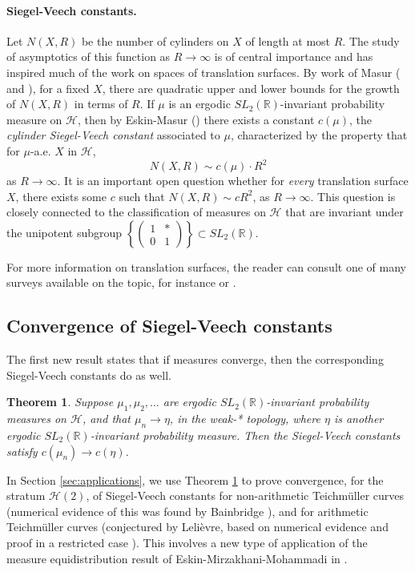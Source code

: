 \documentclass{article}
\newtheorem{thm}{Theorem}[section]
\theoremstyle{definition}
\begin{document}
\paragraph{Siegel-Veech constants.}  Let $N(X,R)$ be the number of cylinders on $X$ of length at most $R$.  The study of asymptotics of this function as $R\to\infty$ is of central importance and has inspired much of the work on spaces of translation surfaces.  By work of Masur (\cite{masur1988} and \cite{masur1990}), for a fixed $X$, there are quadratic upper and lower bounds for the growth of $N(X,R)$ in terms of $R$.  If $\mu$ is an ergodic $SL_2(\mathbb{R})$-invariant probability measure on $\mathcal{H}$, then by Eskin-Masur (\cite{em2001}) there exists a constant $c(\mu)$, the \emph{cylinder Siegel-Veech constant} associated to $\mu$, characterized by the property that for $\mu$-a.e. $X$ in $\mathcal{H}$, 
$$N(X,R) \sim c(\mu) \cdot R^2$$
as $R\to \infty$.  It is an important open question whether for \emph{every} translation surface $X$, there exists some $c$ such that $N(X,R) \sim c R^2$, as $R\to\infty$.  This question is closely connected to the classification of measures on $\mathcal{H}$ that are invariant under the unipotent subgroup $\left\{ \left(\begin{matrix}
    1 & * \\
    0 & 1
  \end{matrix}\right) \right\} \subset SL_2(\mathbb{R})$. 

For more information on translation surfaces, the reader can consult one of many surveys available on the topic, for instance \cite{zorich2006} or \cite{wright2015}.  


\subsection{Convergence of Siegel-Veech constants}

The first new result states that if measures converge, then the corresponding Siegel-Veech constants do as well.  

\begin{thm} Suppose $\mu_1,\mu_2,\ldots$ are ergodic $SL_2(\mathbb{R})$-invariant probability measures on $\mathcal{H}$, and that $\mu_n \to \eta$, in the weak-* topology, where $\eta$ is another ergodic $SL_2(\mathbb{R})$-invariant probability measure.  Then the Siegel-Veech constants satisfy $c(\mu_n) \to c(\eta)$. 
\label{thm:conv}
\end{thm}

In Section \ref{sec:applications}, we use Theorem \ref{thm:conv} to prove convergence, for the stratum $\mathcal{H}(2)$, of Siegel-Veech constants for non-arithmetic Teichm\"uller curves (numerical evidence of this was found by Bainbridge \cite{bainbridge2007}), and for arithmetic Teichm\"uller curves (conjectured by Leli{\`e}vre, based on numerical evidence and proof in a restricted case \cite{lelievre2006}).   This involves a new type of application of the measure equidistribution result of Eskin-Mirzakhani-Mohammadi in \cite{emm2015}. 
\end{document}
